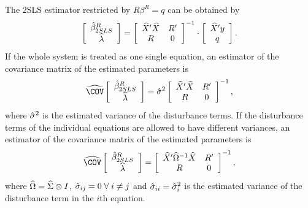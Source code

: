 The 2SLS estimator restricted by $R \beta^R = q$ can be obtained by
\begin{equation}
   \left[ \begin{array}{c}
      \hat{\beta}^R_{2SLS} \\ \widehat{\lambda}
   \end{array} \right]
   =
   \left[ \begin{array}{cc}
      \widehat{X}' \widehat{X} & R' \\ 
      R & 0
   \end{array} \right]^{-1}
   \cdot
   \left[ \begin{array}{c}
      \widehat{X}' y \\ q 
   \end{array} \right] .
   \label{eq:beta2SLSr}
\end{equation}
If the whole system is treated as one single equation,
an estimator of the covariance matrix of the estimated parameters is
\begin{equation}
   \COVHat
   \left[ \begin{array}{c}
      \bHat^R_{2SLS} \\ \widehat{\lambda}
   \end{array} \right] 
   = \sHat^2 
   \left[ \begin{array}{cc}
      \widehat{X}' \widehat{X} & R' \\ 
      R & 0
   \end{array} \right]^{-1} ,
\end{equation}
where $\hat{\sigma}^2$ is the estimated variance of the disturbance terms.
If the disturbance terms of the individual equations
are allowed to have different variances, 
an estimator of the covariance matrix of the estimated parameters is
\begin{equation}
   \COVHat
   \left[ \begin{array}{c}
      \bHat^R_{2SLS} \\ \widehat{\lambda}
   \end{array} \right] 
   = 
   \left[ \begin{array}{cc}
      \widehat{X}' \OHat^{-1} \widehat{X} & R' \\
      R & 0
   \end{array} \right]^{-1} ,
\end{equation}
where $\widehat{\Omega} = \widehat{\Sigma} \otimes I$,
$\hat{\sigma}_{ij} = 0 \; \forall \; i \neq j$ and
$\hat{\sigma}_{ii} = \hat{\sigma}_i^2$ is the estimated variance
of the disturbance term in the $i$th equation.


